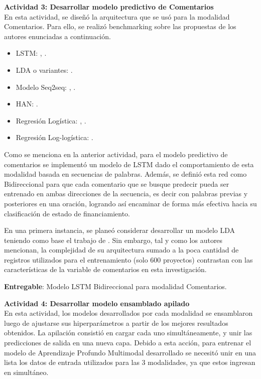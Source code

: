 \textbf{Actividad 3: Desarrollar modelo predictivo de Comentarios}
\\
En esta actividad, se diseñó la arquitectura que se usó para la modalidad Comentarios. Para ello, se realizó benchmarking sobre las propuestas de los autores enunciadas a continuación.

\begin{itemize}
	\item LSTM: \cite{pr_jin2019dayssuccess}, \cite{pr_shafqat2019topicpredictions}.
	\item LDA o variantes: \cite{pr_shafqat2019topicpredictions}.
	\item Modelo Seq2seq: \cite{pr_lee2018contentDL}, \cite{pr_jin2019dayssuccess}.
	\item HAN: \citeauthor{pr_lee2018contentDL}.
	\item Regresión Logística: \cite{pr_li2016predcrowd}, \cite{pr_kaur2017socmedcrowd}.
	\item Regresión Log-logística: \cite{pr_li2016predcrowd}.
\end{itemize}

Como se menciona en la anterior actividad, para el modelo predictivo de comentarios se implementó un modelo de LSTM dado el comportamiento de esta modalidad basada en secuencias de palabras. Además, se definió esta red como Bidireccional para que cada comentario que se busque predecir pueda ser entrenado en ambas direcciones de la secuencia, es decir con palabras previas y posteriores en una oración, logrando así encaminar de forma más efectiva hacia su clasificación de estado de financiamiento.

En una primera instancia, se planeó considerar desarrollar un modelo LDA teniendo como base el trabajo de \cite{pr_shafqat2019topicpredictions}. Sin embargo, tal y como los autores mencionan, la complejidad de su arquitectura sumado a la poca cantidad de registros utilizados para el entrenamiento (solo 600 proyectos) contrastan con las características de la variable de comentarios en esta investigación.

\textbf{Entregable}: Modelo LSTM Bidireccional para modalidad Comentarios.

\textbf{Actividad 4: Desarrollar modelo ensamblado apilado}
\\
En esta actividad, los modelos desarrollados por cada modalidad se ensamblaron luego de ajustarse sus hiperparámetros a partir de los mejores resultados obtenidos. La apilación consistió en cargar cada uno simultáneamente, y unir las predicciones de salida en una nueva capa. Debido a esta acción, para entrenar el modelo de Aprendizaje Profundo Multimodal desarrollado se necesitó unir en una lista los datos de entrada utilizados para las 3 modalidades, ya que estos ingresan en simultáneo.

